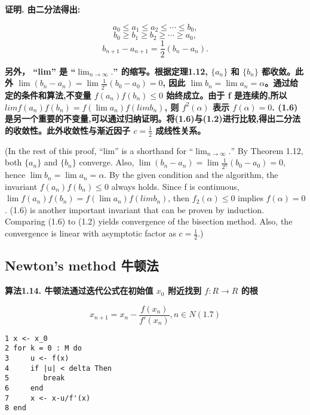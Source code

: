 \documentclass{ctexart}
\begin{document}
\textbf{证明. 由二分法得出:}

\[
a_0 \le a_1 \le a_2 \le \cdots \le b_0,
\]
\[
b_0 \ge b_1 \ge b_2 \ge \cdots \ge a_0,
\]
\[
b_{n+1}-a_{n+1} = \frac{1}{2}(b_n - a_n).
\]

\textbf{另外， “lim” 是 “$\lim_{n\rightarrow\infty}.$” 的缩写。根据定理1.12, $\{a_n\}$ 和 $\{b_n\}$ 都收敛。此外 $\lim(b_n − a_n) = \lim \frac{1}{2^n}(b_0 − a_0) = 0$, 因此 $\lim b_n = \lim a_n = \alpha$。通过给定的条件和算法,不变量 $f(a_n)f(b_n) \le 0$ 始终成立。由于 f 是连续的,所以 $limf(a_n)f(b_n) = f(\lim a_n)f(lim b_n)$, 则 $f^2(\alpha)$ 表示 $f(\alpha) = 0$. (1.6)是另一个重要的不变量,可以通过归纳证明。将(1.6)与(1.2)进行比较,得出二分法的收敛性。此外收敛性与渐近因子 $c = \frac{1}{2}$ 成线性关系。}

(In the rest of this proof, “lim” is a shorthand for “$\lim_{n \rightarrow \infty}.$” By Theorem 1.12, both $\{a_n\}$ and $\{b_n\}$ converge. Also, $\lim(b_n − a_n) = \lim \frac{1}{2^n}(b_0 − a_0) = 0$, hence $\lim b_n = \lim a_n = \alpha$. By the given condition and the algorithm, the invariant $f(a_n)f(b_n) \le 0$ always holds. Since f is continuous, $\lim f(a_n)f(b_n) = f(\lim a_n)f(lim b_n)$, then $f_2(\alpha) \le 0$ implies $f(\alpha) = 0$. (1.6) is another important invariant that can be proven by induction. Comparing (1.6) to (1.2) yields convergence of the bisection method. Also, the convergence is linear with asymptotic factor as $c = \frac{1}{2}$.)

\subsection{Newton’s method 牛顿法}

\textbf{算法1.14. 牛顿法通过迭代公式在初始值 $x_0$ 附近找到 $f : R \rightarrow R$ 的根}

\[
x_{n+1} = x_n - \frac{f(x_n)}{f'(x_n)},  n \in N   (1.7)
\]

\begin{verbatim}
1 x <- x_0
2 for k = 0 : M do
3     u <- f(x)
4     if |u| < delta Then
5        break
6     end
7     x <- x-u/f'(x)
8 end
\end{verbatim}
\end{document}
